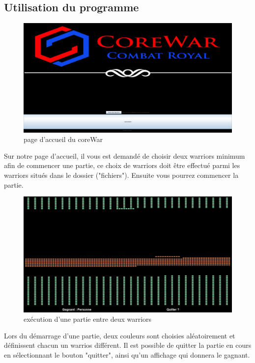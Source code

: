 \documentclass[a4paper,12pt]{article}
\begin{document}
\subsection{Utilisation du programme}
\begin{figure}[H]
\includegraphics[scale=0.3]{ac.png}
\caption{page d'accueil du coreWar}
\end{figure}
Sur notre page d'accueil, il vous est demandé de choisir deux warriors minimum afin de commencer une partie, ce choix de warriors doit être effectué parmi les warriors situés dans le dossier ("fichiers"). Ensuite vous pourrez commencer la partie.\\
\begin{figure}[H]
\includegraphics[scale=0.3]{cp.png}
\caption{exécution d'une partie entre deux warriors}
\end{figure}
Lors du démarrage d'une partie, deux couleurs sont choisies aléatoirement et définissent chacun un warrios différent. Il est possible de quitter la partie en cours en sélectionnant le bouton "quitter", ainsi qu'un affichage qui donnera le gagnant.
\end{document}
